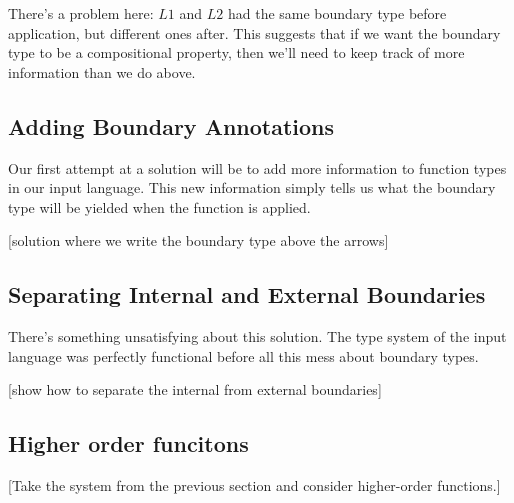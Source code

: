 \documentclass[]{article}
\begin{document}
\begin{abstrsyn}
There's a problem here: $L1$ and $L2$ had the same boundary type before application, but different ones after.
This suggests that if we want the boundary type to be a compositional property,
then we'll need to keep track of more information than we do above.

\subsection{Adding Boundary Annotations}

Our first attempt at a solution will be to add more information to function types in our input language.
This new information simply tells us what the boundary type will be yielded when the function is applied.

[solution where we write the boundary type above the arrows]

\subsection{Separating Internal and External Boundaries}

There's something unsatisfying about this solution. 
The type system of the input language was perfectly functional before all this mess about boundary types.

[show how to separate the internal from external boundaries]

\subsection{Higher order funcitons}

[Take the system from the previous section and consider higher-order functions.]





\end{abstrsyn}
\end{document}
